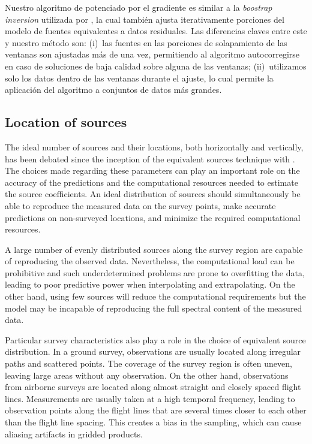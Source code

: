 Nuestro algoritmo de potenciado por el gradiente es similar a la \emph{boostrap
inversion} utilizada por \citet{vonfrese1988}, la cual también ajusta
iterativamente porciones del modelo de fuentes equivalentes a datos residuales.
Las diferencias claves entre este y nuestro método son:
(i)~las fuentes en las porciones de solapamiento de las ventanas son ajustadas
más de una vez, permitiendo al algoritmo autocorregirse en caso de soluciones
de baja calidad sobre alguna de las ventanas;
(ii)~utilizamos solo los datos dentro de las ventanas durante el ajuste, lo
cual permite la aplicación del algoritmo a conjuntos de datos más grandes.


\subsection{Location of sources}
\label{sec:source_distribution}

The ideal number of sources and their locations, both horizontally and
vertically, has been debated since the inception of the equivalent sources
technique with \citet{dampney1969}.
The choices made regarding these parameters can play an important role on the
accuracy of the predictions and the computational resources needed to estimate
the source coefficients.
An ideal distribution of sources should simultaneously be able to reproduce the
measured data on the survey points, make accurate predictions on non-surveyed
locations, and minimize the required computational resources.

A large number of evenly distributed sources along the survey region are
capable of reproducing the observed data.
Nevertheless, the computational load can be prohibitive and such
underdetermined problems are prone to overfitting the data, leading to poor
predictive power when interpolating and extrapolating.
On the other hand, using few sources will reduce the computational requirements
but the model may be incapable of reproducing the full spectral content of the
measured data.

Particular survey characteristics also play a role in the choice of equivalent
source distribution.
In a ground survey, observations are usually located along irregular paths and
scattered points.
The coverage of the survey region is often uneven, leaving large areas without
any observation.
On the other hand, observations from airborne surveys are located along almost
straight and closely spaced flight lines.
Measurements are usually taken at a high temporal frequency, leading to
observation points along the flight lines that are several times closer to each
other than the flight line spacing.
This creates a bias in the sampling, which can cause aliasing artifacts in
gridded products.

